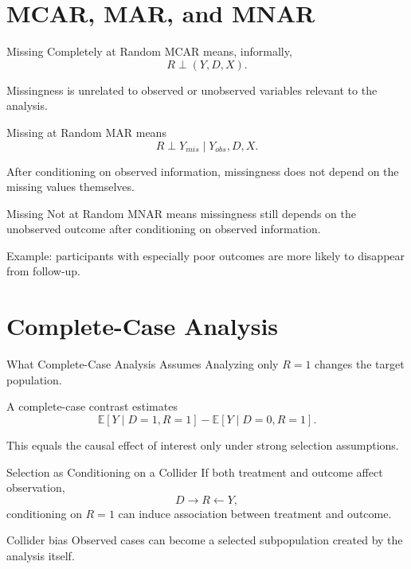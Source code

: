 \documentclass[aspectratio=169,11pt]{beamer}
\newcommand{\E}{\mathbb{E}}
\begin{document}
\section{MCAR, MAR, and MNAR}

\begin{frame}{Missing Completely at Random}
MCAR means, informally,
\[
R \perp (Y,D,X).
\]

Missingness is unrelated to observed or unobserved variables relevant to the analysis.
\end{frame}

\begin{frame}{Missing at Random}
MAR means
\[
R \perp Y_{mis} \mid Y_{obs},D,X.
\]

After conditioning on observed information, missingness does not depend on the missing values themselves.
\end{frame}

\begin{frame}{Missing Not at Random}
MNAR means missingness still depends on the unobserved outcome after conditioning on observed information.

Example: participants with especially poor outcomes are more likely to disappear from follow-up.
\end{frame}

\section{Complete-Case Analysis}

\begin{frame}{What Complete-Case Analysis Assumes}
Analyzing only \(R=1\) changes the target population.

A complete-case contrast estimates
\[
\E[Y\mid D=1,R=1]-\E[Y\mid D=0,R=1].
\]

This equals the causal effect of interest only under strong selection assumptions.
\end{frame}

\begin{frame}{Selection as Conditioning on a Collider}
If both treatment and outcome affect observation,
\[
D \rightarrow R \leftarrow Y,
\]
conditioning on \(R=1\) can induce association between treatment and outcome.

\begin{alertblock}{Collider bias}
Observed cases can become a selected subpopulation created by the analysis itself.
\end{alertblock}
\end{frame}
\end{document}
